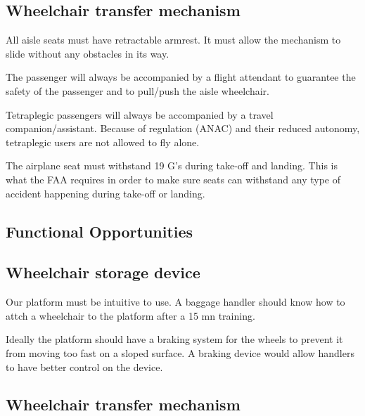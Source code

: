 \subsection*{Wheelchair transfer mechanism}

\begin{list}{-}{}
  \item All aisle seats must have retractable armrest. It must allow the mechanism to slide without any obstacles in its way.
  \item The passenger will always be accompanied by a flight attendant to guarantee the safety of the passenger and to pull/push the aisle wheelchair.
  \item Tetraplegic passengers will always be accompanied by a travel companion/assistant. Because of regulation (ANAC) and their reduced autonomy, tetraplegic users are not allowed to fly alone.
  \item The airplane seat must withstand 19 G's during take-off and landing. This is what the FAA requires in order to make sure seats can withstand any type of accident happening during take-off or landing.
\end{list}

\subsection{Functional Opportunities}

\subsection*{Wheelchair storage device}

\begin{list}{-}{}
  \item Our platform must be intuitive to use. A baggage handler should know how to attch a wheelchair to the platform after a 15 mn training.
  \item Ideally the platform should have a braking system for the wheels to prevent it from moving too fast on a sloped surface. A braking device would allow handlers to have better control on the device.
\end{list}

\subsection*{Wheelchair transfer mechanism}

